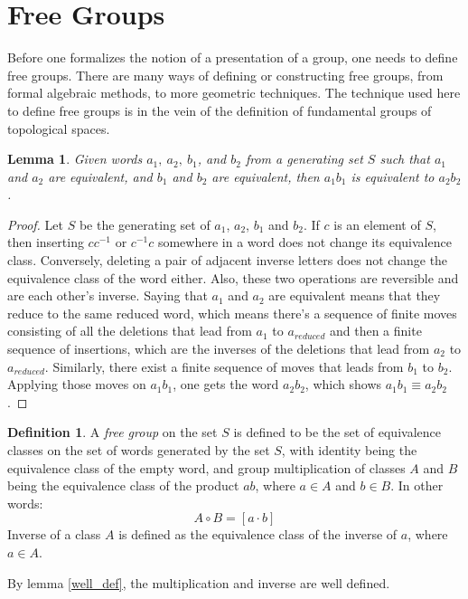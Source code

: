 \documentclass[12pt, titlepage]{article}
\newtheorem{lem}[thm]{Lemma}
\theoremstyle{definition}
\newtheorem{defn}{Definition}[section]
\begin{document}
\section{Free Groups}\label{freegroups}
Before one formalizes the notion of a presentation of a group, one needs to define free groups. There are many ways of defining or constructing free groups, from formal algebraic methods, to more geometric techniques\cite{meier}. The technique used here to define free groups is in the vein of the definition of fundamental groups of topological spaces.

\begin{lem}\label{well_def}
Given words $a_1,\ a_2,\ b_1$, and $b_2$ from a generating set $S$ such that $a_1$ and $a_2$ are equivalent, and $b_1$ and $b_2$ are equivalent, then $a_1b_1$ is equivalent to $a_2b_2$.
\end{lem}

\begin{proof}
Let $S$ be the generating set of $a_1$, $a_2$, $b_1$ and $b_2$. If $c$ is an element of $S$, then inserting $cc^{-1}$ or $c^{-1}c$ somewhere in a word does not change its equivalence class. Conversely, deleting a pair of adjacent inverse letters does not change the equivalence class of the word either. Also, these two operations are reversible and are each other's inverse. Saying that $a_1$ and $a_2$ are equivalent means that they reduce to the same reduced word, which means there's a sequence of finite moves consisting of all the deletions that lead from $a_1$ to $a_{reduced}$ and then a finite sequence of insertions, which are the inverses of the deletions that lead from $a_2$ to $a_{reduced}$. Similarly, there exist a finite sequence of moves that leads from $b_1$ to $b_2$. Applying those moves on $a_1b_1$, one gets the word $a_2b_2$, which shows $a_1b_1 \equiv a_2b_2$.
\end{proof}

\begin{defn}
A \emph{free group} on the set $S$ is defined to be the set of equivalence classes on the set of words generated by the set $S$, with identity being the equivalence class of the empty word, and group multiplication of classes $A$ and $B$ being the equivalence class of the product $ab$, where $a \in A$ and $b \in B$. In other words:
$$A \circ B = [a \cdot b]$$
Inverse of a class $A$ is defined as the equivalence class of the inverse of $a$, where $a \in A$.
\end{defn}
By lemma \autoref{well_def}, the multiplication and inverse are well defined.
\end{document}

